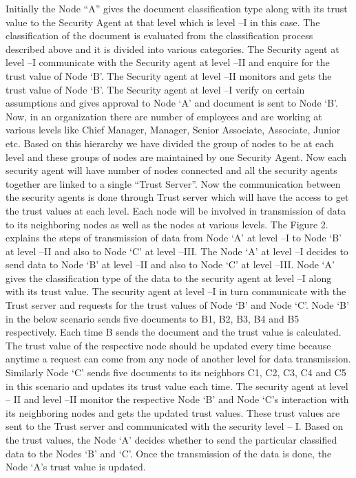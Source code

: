 Initially the Node “A” gives the document classification type along with its
trust value to the Security Agent at that level which is level –I in this case.
The classification of the document is evaluated from the classification process
described above and it is divided into various categories. The Security agent at
level –I communicate with the Security agent at level –II and enquire for the
trust value of Node ‘B'. The Security agent at level –II monitors and gets the
trust value of Node ‘B'. The Security agent at level –I verify on certain
assumptions and gives approval to Node ‘A' and document is sent to Node ‘B'.
Now, in an organization there are number of employees and are working at various
levels like Chief Manager, Manager, Senior Associate, Associate, Junior etc.
Based on this hierarchy we have divided the group of nodes to be at each level
and these groups of nodes are maintained by one Security Agent. Now each
security agent will have number of nodes connected and all the security agents
together are linked to a single “Trust Server”. Now the communication between
the security agents is done through Trust server which will have the access to
get the trust values at each level. Each node will be involved in transmission
of data to its neighboring nodes as well as the nodes at various levels. The
Figure 2. explains the steps of transmission of data from Node ‘A' at level –I
to Node ‘B' at level –II and also to Node ‘C' at level –III. The Node ‘A' at
level –I decides to send data to Node ‘B' at level –II and also to Node ‘C' at
level –III. Node ‘A' gives the classification type of the data to the security
agent at level –I along with its trust value. The security agent at level –I in
turn communicate with the Trust server and requests for the trust values of Node
‘B' and Node ‘C'. Node ‘B' in the below scenario sends five documents to B1, B2,
B3, B4 and B5 respectively. Each time B sends the document and the trust value
is calculated. The trust value of the respective node should be updated every
time because anytime a request can come from any node of another level for data
transmission. Similarly Node ‘C' sends five documents to its neighbors C1, C2,
C3, C4 and C5 in this scenario and updates its trust value each time. The
security agent at level – II and level –II monitor the respective Node ‘B' and
Node ‘C's interaction with its neighboring nodes and gets the updated trust
values. These trust values are sent to the Trust server and communicated with
the security level – I. Based on the trust values, the Node ‘A' decides whether
to send the particular classified data to the Nodes ‘B' and ‘C'. Once the
transmission of the data is done, the Node ‘A's trust value is updated.

